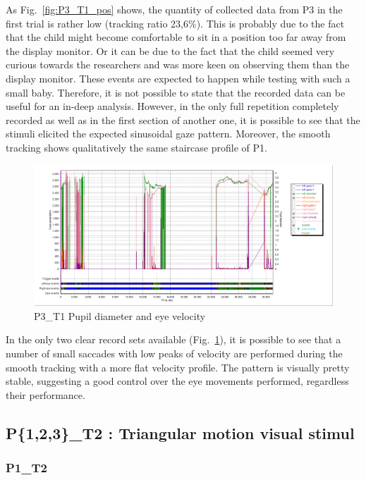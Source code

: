 As Fig.~\ref{fig:P3_T1_pos} shows, the quantity of collected data from P3 in the first trial is rather low (tracking ratio 23,6\%). This is probably due to the fact that the child might become comfortable to sit in a position too far away from the display monitor. Or it can be due to the fact that the child seemed very curious towards the researchers and was more keen on observing them than the display monitor. These events are expected to happen while testing with such a small baby. Therefore, it is not possible to state that the recorded data can be useful for an in-deep analysis. However, in the only full repetition completely recorded as well as in the first section of another one, it is possible to see that the stimuli elicited the expected sinusoidal gaze pattern. Moreover, the smooth tracking shows qualitatively the same staircase profile of P1.

\begin{figure}[t]
  \centering
  \includegraphics[width=.8\textwidth]{figures/graphs/P3_T1(sinusoid)_VP.png}
  \caption[P3\_T1 Pupil size and velocity profile]{P3\_T1 Pupil diameter and eye velocity}
  \label{fig:P3_T1_vel}
\end{figure}

In the only two clear record sets available (Fig.~\ref{fig:P3_T1_vel}), it is possible to see that a number of small saccades with low peaks of velocity are performed during the smooth tracking with a more flat velocity profile. The pattern is visually pretty stable, suggesting a good control over the eye movements performed, regardless their performance.



\subsection{P\{1,2,3\}\_T2 : Triangular motion visual stimul}
\label{sec:P123_T2}

\subsubsection{P1\_T2}
\label{sec:P1_T2}


